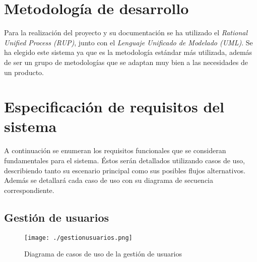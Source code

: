 
\section{Metodología de desarrollo}
Para la realización del proyecto y su documentación se ha utilizado el {\em Rational Unified Process (RUP)}, junto con el {\em Lenguaje Unificado de Modelado (UML)}. Se ha elegido este sistema ya que es la metodología estándar más utilizada, además de ser un grupo de metodologías que se adaptan muy bien a las necesidades de un producto.

\section{Especificación de requisitos del sistema}
A continuación se enumeran los requisitos funcionales que se consideran fundamentales para el sistema. Éstos serán detallados utilizando casos de uso, describiendo tanto su escenario principal como sus posibles flujos alternativos. Además se detallará cada caso de uso con su diagrama de secuencia correspondiente.

\subsection{Gestión de usuarios}
\begin{figure}[H]
\label{gestion-usuarios}
\begin{center}
\texttt{[image: ./gestionusuarios.png]}
\end{center}
\caption{Diagrama de casos de uso de la gestión de usuarios}
\end{figure}

